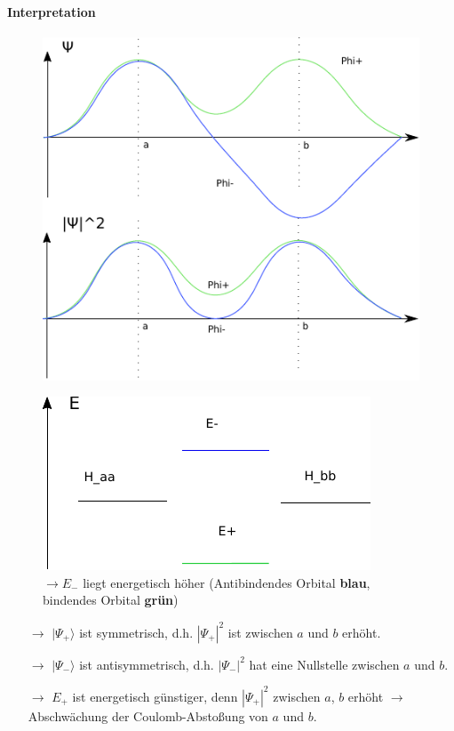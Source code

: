 \paragraph{Interpretation}

\begin{figure}[H]
	\centering
	\includegraphics{figures/1_4graph.pdf}
	\caption{}
	\label{}
\end{figure}

\begin{figure}[H]
	\centering
	\includegraphics{figures/1_4Energie.pdf}
	\caption{$\rightarrow E_-$ liegt energetisch höher (Antibindendes Orbital \textbf{blau}, bindendes Orbital \textbf{grün})}
	\label{}
\end{figure}
\begin{itemize}
	\item[$\rightarrow$] $\vert\Psi_+\rangle$ ist symmetrisch, d.h. $|\Psi_+|^2$ ist zwischen $a$ und $b$ erhöht.
	\item[$\rightarrow$] $\vert\Psi_-\rangle$ ist antisymmetrisch, d.h. $|\Psi_-|^2$ hat eine Nullstelle zwischen $a$ und $b$.
	\item[$\rightarrow$] $E_+$ ist energetisch günstiger, denn $|\Psi_+|^2$ zwischen $a$, $b$ erhöht $\rightarrow$ Abschwächung der Coulomb-Abstoßung von $a$ und $b$.
\end{itemize}

